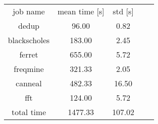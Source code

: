 \begin{table}[h]
\centering
	\begin{tabular}{ |c|c|c|c|c|}
	\hline
	job name & mean time [s] & std [s] \\
	\hhline{ |= |= |= |}
	dedup & 96.00 & 0.82 \\  \hline
	blackscholes & 183.00 & 2.45 \\  \hline
	ferret & 655.00 & 5.72 \\  \hline
	freqmine & 321.33 & 2.05 \\  \hline
	canneal & 482.33 & 16.50 \\  \hline
	fft & 124.00 & 5.72 \\  \hline
	total time & 1477.33 & 107.02 \\  \hline
	\end{tabular}
\end{table}
